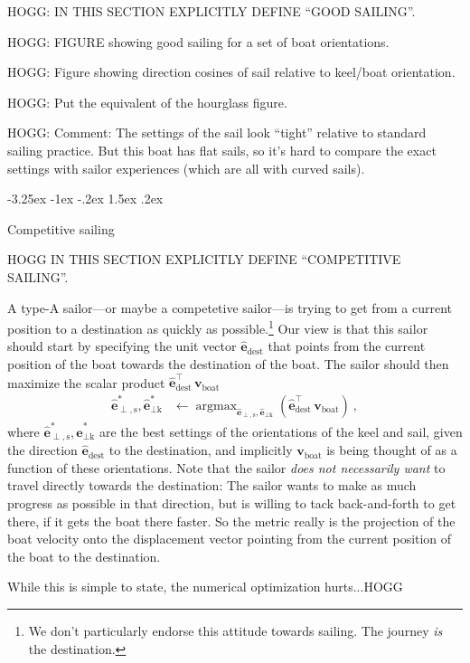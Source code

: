 \documentclass{article}
\makeatletter
\DeclareMathOperator*{\argmax}{argmax}
\renewcommand{\vec}[1]{\boldsymbol{#1}}
\newcommand{\uvec}{\vec{\hat{e}}}
\newcommand{\boat}{\text{boat}}
\newcommand{\destination}{\text{dest}}
\newcommand{\sail}{\text{s}}
\newcommand{\keel}{\text{k}}
\newcommand{\vboat}{\vec{v}_\boat}
\renewcommand\section{\@startsection {section}{1}{\z@}%
  {-3.25ex \@plus -1ex \@minus -.2ex}%
  {1.5ex \@plus .2ex}%
  {\raggedright\normalfont\large\bfseries}}
\makeatother
\begin{document}
HOGG: IN THIS SECTION EXPLICITLY DEFINE ``GOOD SAILING''.

HOGG: FIGURE showing good sailing for a set of boat orientations.

HOGG: Figure showing direction cosines of sail relative to keel/boat orientation.

HOGG: Put the equivalent of the hourglass figure.

HOGG: Comment: The settings of the sail look ``tight'' relative to standard sailing practice. But this boat has flat sails, so it's hard to compare the exact settings with sailor experiences (which are all with curved sails).

\section{Competitive sailing}\label{sec:racing}

HOGG IN THIS SECTION EXPLICITLY DEFINE ``COMPETITIVE SAILING''.

A type-A sailor---or maybe a competetive sailor---is trying to get from a current position to a destination as quickly as possible.\footnote{We don't particularly endorse this attitude towards sailing. The journey \emph{is} the destination.}
Our view is that this sailor should start by specifying the unit vector $\uvec_\destination$ that points from the current position of the boat towards the destination of the boat.
The sailor should then maximize the scalar product $\uvec_\destination^\top\,\vboat$
\begin{align}
    \uvec_{\perp,\sail}^\ast,\uvec_{\perp\keel}^\ast &\leftarrow \argmax_{\uvec_{\perp,\sail},\uvec_{\perp\keel}} (\uvec_\destination^\top\,\vboat) ~,
\end{align}
where $\uvec_{\perp,\sail}^\ast,\uvec_{\perp\keel}^\ast$ are the best settings of the orientations of the keel and sail, given the direction $\uvec_\destination$ to the destination, and implicitly $\vboat$ is being thought of as a function of these orientations.
Note that the sailor \emph{does not necessarily want} to travel directly towards the destination:
The sailor wants to make as much progress as possible in that direction, but is willing to tack back-and-forth to get there, if it gets the boat there faster.
So the metric really is the projection of the boat velocity onto the displacement vector pointing from the current position of the boat to the destination.

While this is simple to state, the numerical optimization hurts...HOGG
\end{document}
